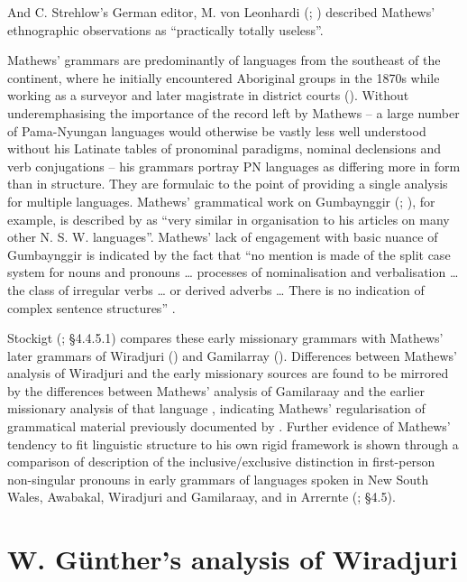 And C. Strehlow’s German editor, M. von Leonhardi (\citeyear{leonhardi_letter_1908-2}; )  described Mathews' ethnographic observations as “practically totally useless”.

Mathews' grammars are predominantly of languages from the southeast of the continent, where he initially encountered Aboriginal groups in the 1870s while working as a surveyor and later magistrate in district courts (\citealt{Thomas_2011}). Without underemphasising the importance of the record left by Mathews – a large number of Pama-Nyungan languages would otherwise be vastly less well understood without his Latinate tables of pronominal paradigms, nominal declensions and verb conjugations – his grammars portray PN languages as differing more in form than in structure. They are formulaic to the point of providing a single analysis for multiple languages. Mathews' grammatical work on Gumbaynggir (\citeyear{mathews_aboriginal_1902}; \citeyear{mathews_notes_1910}), for example, is described by \citet[256]{eades_gumbaynggir_1979} as “very similar in organisation to his articles on many other N. S. W. languages”. Mathews' lack of engagement with basic nuance of Gumbaynggir is indicated by the fact that “no mention is made of the split case system for nouns and pronouns … processes of nominalisation and verbalisation … the class of irregular verbs … or derived adverbs … There is no indication of complex sentence structures” \citep[257]{eades_gumbaynggir_1979}.

Stockigt (\citeyear{Stockigt_2017}; §4.4.5.1) compares these early missionary grammars with Mathews' later grammars of Wiradjuri (\citeyear{mathews_wiradyuri_1904}) and Gamilarray (\citeyear{mathews_languages_1903}). Differences between Mathews' analysis of Wiradjuri and the early missionary sources are found to be mirrored by the differences between Mathews' analysis of Gamilaraay and the earlier missionary analysis of that language \citep{ridley_kamilaroi_1875}, indicating Mathews' regularisation of grammatical material previously documented by \citet[256]{eades_gumbaynggir_1979}. Further evidence of Mathews' tendency to fit linguistic structure to his own rigid framework is shown through a comparison of description of the inclusive/exclusive distinction in first-person non-singular pronouns in early grammars of languages spoken in New South Wales, Awabakal, Wiradjuri and Gamilaraay, and in Arrernte (\citealt{Stockigt_2017}; §4.5).

\section{W. Günther’s analysis of Wiradjuri}
\label{sec:key:4.4}
\label{sec:4.4}

